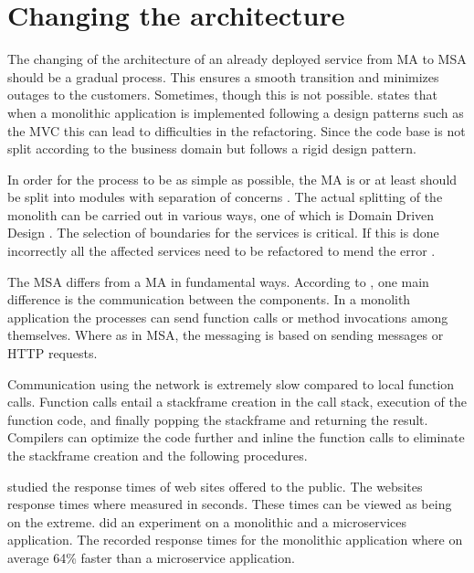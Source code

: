 \section{Changing the architecture}
\begin{sloppypar}
    The changing of the architecture of an already deployed service from MA to
    MSA should be a gradual process. This ensures a smooth transition and
    minimizes outages to the customers. Sometimes, though this is not possible.
    \citet{newman2019} states that when a monolithic application is implemented
    following a design patterns such as the MVC \citep{trygvemvc} this can lead
    to difficulties in the refactoring. Since the code base is not split
    according to the business domain but follows a rigid design pattern.
\end{sloppypar}
\begin{sloppypar}
    In order for the process to be as simple as possible, the MA is or at least
    should be split into modules with separation of concerns \citep{secchalmsa}.
    The actual splitting of the monolith can be carried out in various ways, one
    of which is Domain Driven Design \citep{evans2003}. The selection of
    boundaries for the services is critical. If this is done incorrectly all the
    affected services need to be refactored to mend the error
    \citep{newman2019}.
\end{sloppypar}
\begin{sloppypar}
    The MSA differs from a MA in fundamental ways. According to
    \citet{fowlerlewisms}, one main difference is the communication between the
    components. In a monolith application the processes can send function calls
    or method invocations among themselves. Where as in MSA, the messaging is
    based on sending messages or HTTP requests. 
\end{sloppypar}
\begin{sloppypar}
    Communication using the network is extremely slow compared to local function
    calls. Function calls entail a stackframe creation in the call stack,
    execution of the function code, and finally popping the stackframe and
    returning the result. Compilers can optimize the code further and inline the
    function calls to eliminate the stackframe creation and the following
    procedures.
\end{sloppypar}
\begin{sloppypar}
    \citet{webdelays} studied the response times of web sites offered to the
    public. The websites response times where measured in seconds. These times
    can be viewed as being on the extreme. \citet{Johansson_2019} did an
    experiment on a monolithic and a microservices application. The recorded
    response times for the monolithic application where on average 64\% faster
    than a microservice application.
\end{sloppypar}
